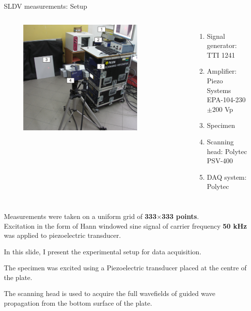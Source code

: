 \documentclass[10pt,aspectratio=169,dvipsnames]{beamer} %
\begin{document}
	\begin{frame}[t]{SLDV measurements: Setup}
		\begin{columns}[T]
			\begin{figure}
				\includegraphics[width=0.8\textwidth]{wibrometr-laserowy-1d_small-description.png}
			\end{figure}
			\begin{enumerate}
				\item Signal generator: TTI 1241 
				\item Amplifier: Piezo Systems EPA-104-230 $\pm$200 Vp
				\item Specimen
				\item Scanning head: Polytec PSV-400
				\item DAQ system: Polytec
			\end{enumerate}
		\end{columns}
		{\small
			Measurements were taken on a uniform grid of \textbf{333$\times$333 points}.\\
			Excitation in the form of Hann windowed sine signal of carrier frequency \textbf{50 kHz} was applied to piezoelectric transducer.}
		\end{frame}
	\note
	{
		In this slide, I present the experimental setup for data acquisition.
		
		The specimen was excited using a Piezoelectric transducer placed at the centre of the plate.
		
		The scanning head is used to acquire the full wavefields of guided wave propagation from the bottom surface of the plate.	
	}
\end{document}

